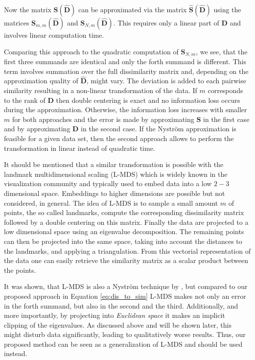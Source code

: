 \documentclass[twoside,11pt]{article}
\begin{document}
Now the matrix $\mathbf{S(\hat{D})}$ can be approximated via the matrix
$\mathbf{\hat{S}(\hat{D})}$ using the matrices
$\mathbf{S}_{m,m}(\mathbf{\hat{D}})$ and $\mathbf{S}_{N,m}(\mathbf{\hat{D}})$.
This requires only a linear part of $\mathbf{D}$ and involves linear computation time.

Comparing this approach to the quadratic computation of $\mathbf{S}_{N,m}$,
we see, that the first three summands are identical
and only the forth summand is different.
This term involves summation over the full dissimilarity matrix
and, depending on the approximation quality of $\mathbf{\hat{D}}$, might vary.
The deviation is added to each pairwise similarity
resulting in a non-linear transformation of the data.
If $m$ corresponds to the rank of $\mathbf{D}$
then double centering is exact
and no information loss occurs during the approximation.
Otherwise, the information loss increases with smaller $m$
for both approaches
and the error is made by approximating $\mathbf{S}$ in the first case
and by approximating $\mathbf{D}$ in the second case.
If the Nystr\"om approximation is feasible for a given data set,
then the second approach allows
to perform the transformation in linear instead of quadratic time.

It should be mentioned that a similar transformation is possible with
the landmark multidimensional scaling (L-MDS) \cite{DBLP:conf/nips/SilvaT02}
which is widely known in the visualization community and typically used to 
embed data into a low $2-3$ dimensional space. Embeddings to higher dimensions
are possible but not considered, in general.
The idea of L-MDS is to sample a small amount $m$ of points, the so called landmarks,
compute the corresponding dissimilarity matrix
followed by a double centering on this matrix.
Finally the data are projected to a low dimensional space
using an eigenvalue decomposition.
The remaining points can then be projected into the same space,
taking into account the distances to the landmarks, and applying a triangulation.
From this vectorial representation of the data
one can easily retrieve the similarity
matrix as a scalar product between the points.

It was shown, that L-MDS is also a Nystr\"om technique by \cite{Platt:2005},
but compared to our proposed approach in Equation \eqref{eq:dis_to_sim}
L-MDS makes not only an error in the forth summand, but also in the second and the third.
Additionally, and more importantly, by projecting into \emph{Euclidean space}
it makes an implicit clipping of the eigenvalues. 
As discussed above and will be shown later,
this might disturb data significantly, leading to qualitatively worse results.
Thus, our proposed method can be seen as a generalization of L-MDS
and should be used instead.
\end{document}
